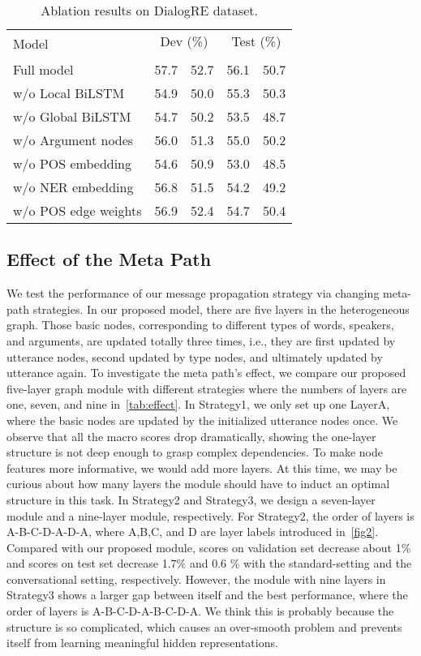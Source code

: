 \documentclass[11pt]{article}
\begin{document}
\begin{table}[ht]
\centering
\small
\begin{tabular}{l|cccc}
\toprule
\multirow{2}{*}{Model} &
\multicolumn{2}{c}{Dev (\%)} &
\multicolumn{2}{c}{Test (\%)} \\
&  &  &  &  \\
\midrule
Full model & 57.7 & 52.7 & 56.1 & 50.7 \\
w/o Local BiLSTM & 54.9 & 50.0 & 55.3 & 50.3 \\
w/o Global BiLSTM & 54.7 & 50.2  & 53.5 & 48.7 \\
w/o Argument nodes & 56.0 & 51.3 & 55.0 & 50.2 \\
w/o POS embedding & 54.6 & 50.9 & 53.0 & 48.5   \\
w/o NER embedding & 56.8 & 51.5 & 54.2 & 49.2 \\
w/o POS edge weights & 56.9 & 52.4 & 54.7 & 50.4 \\


\bottomrule
\end{tabular}
\caption{Ablation results on DialogRE dataset. }
\label{tab:ablation}
\end{table}

\subsection{Effect of the Meta Path}
We test the performance of our message propagation strategy via changing meta-path strategies. In our proposed model, there are five layers in the heterogeneous graph.
Those basic nodes, corresponding to different types of words, speakers, and arguments, are updated totally three times, i.e., they are first updated by utterance nodes, second updated by type nodes, and ultimately updated by utterance again.
To investigate the meta path's effect, we compare our proposed five-layer graph module with different strategies where the numbers of layers are one, seven, and nine in~\cref{tab:effect}.
In Strategy1, we only set up one LayerA, where the basic nodes are updated by the initialized utterance nodes once.
We observe that all the macro  scores drop dramatically, showing the one-layer structure is not deep enough to grasp complex dependencies. To make node features more informative, we would add more layers.
At this time, we may be curious about how many layers the module should have to induct an optimal structure in this task.
In Strategy2 and Strategy3, we design a seven-layer module and a nine-layer module, respectively. For Strategy2, the order of layers is A-B-C-D-A-D-A, where A,B,C, and D are layer labels introduced in~\cref{fig2}. Compared with our proposed module, scores on validation set decrease about 1\% and scores on test set decrease 1.7\% and 0.6 \% with the standard-setting and the conversational setting, respectively.
However, the module with nine layers in Strategy3 shows a larger gap between itself and the best performance, where the order of layers is A-B-C-D-A-B-C-D-A. We think this is probably because the structure is so complicated, which causes an over-smooth problem and prevents itself from learning meaningful hidden representations.
\end{document}
